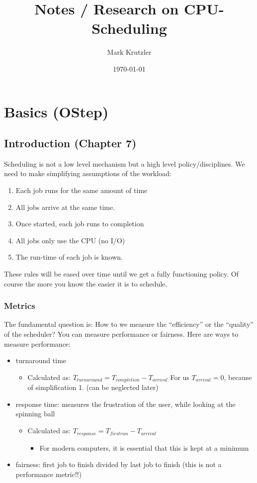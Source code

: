 \documentclass[11pt]{report}
\author{Mark Krutzler}
\date{\today}
\title{Notes / Research on CPU-Scheduling}
\begin{document}
\maketitle
\tableofcontents

\part{Basics (OStep)}
\label{sec:orgce4bae2}
\chapter{Introduction (Chapter 7)}
\label{sec:org02640b6}
Scheduling is not a low level mechanism but a high level policy/disciplines.
We need to make simplifying assumptions of the workload:
\begin{enumerate}
\item Each job runs for the same amount of time
\item All jobs arrive at the same time.
\item Once started, each job runs to completion
\item All jobs only use the CPU (no I/O)
\item The run-time of each job is known.
\end{enumerate}
These rules will be eased over time until we get a fully functioning policy.
Of course the more you know the easier it is to schedule.
\section{Metrics}
\label{sec:orgb0f9911}
The fundamental question is: How to we measure the ``efficiency'' or the ``quality'' of the scheduler?
You can measure performance or fairness. Here are ways to measure performance:
\begin{itemize}
\item turnaround time
\begin{itemize}
\item Calculated as:
\(T_{turnaround} = T_{completion} - T_{arrival}\)
For us \(T_{arrival} = 0\), because of simplification 1. (can be neglected later)
\end{itemize}
\item response time: measures the frustration of the user, while looking at the spinning ball
\begin{itemize}
\item Calculated as:
\(T_{response} = T_{firstrun} - T_{arrival}\)
\begin{itemize}
\item For modern computers, it is essential that this is kept at a minimum
\end{itemize}
\end{itemize}
\item fairness: first job to finish divided by last job to finish (this is not a performance metric!!)
\end{itemize}
\end{document}

